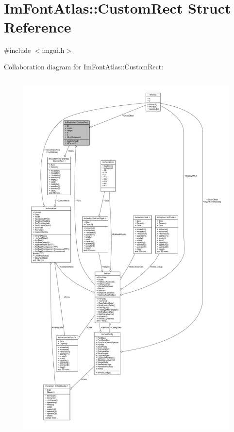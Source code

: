 \hypertarget{struct_im_font_atlas_1_1_custom_rect}{}\section{Im\+Font\+Atlas\+:\+:Custom\+Rect Struct Reference}
\label{struct_im_font_atlas_1_1_custom_rect}


{\ttfamily \#include $<$imgui.\+h$>$}



Collaboration diagram for Im\+Font\+Atlas\+:\+:Custom\+Rect\+:
\nopagebreak
\begin{figure}[H]
\begin{center}
\leavevmode
\includegraphics[height=550pt]{struct_im_font_atlas_1_1_custom_rect__coll__graph}
\end{center}
\end{figure}
